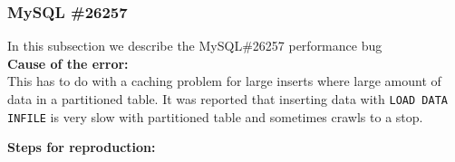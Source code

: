 \subsubsection{MySQL \#26257}

In this subsection we describe the MySQL\#26257 performance bug \\

\noindent \textbf{Cause of the error:} \\

This has to do with a caching problem for large inserts where large amount of data in a partitioned table.
It was reported that inserting data with \texttt{LOAD DATA INFILE} is very slow with partitioned table and sometimes crawls to a stop.

\noindent \textbf{Steps for reproduction:} \\

